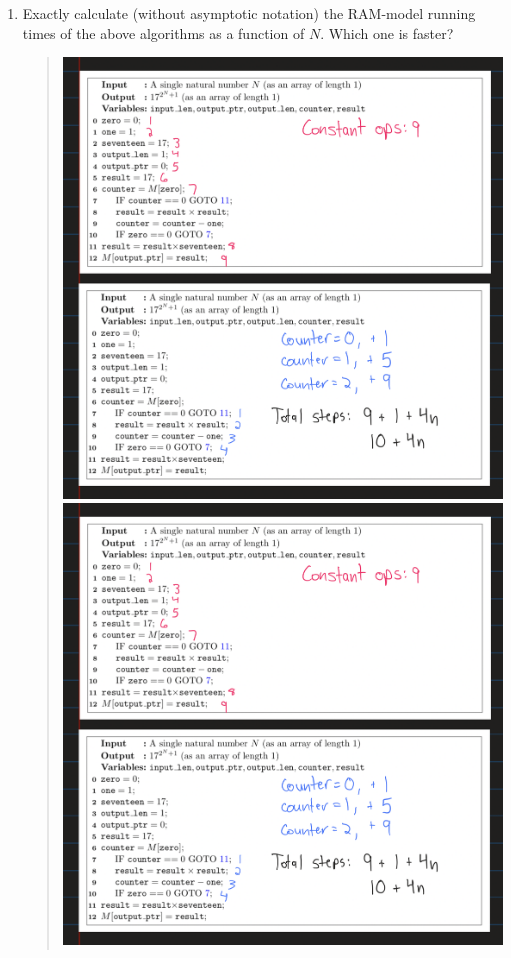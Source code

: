 \documentclass[11pt]{article}
\begin{document}
\begin{enumerate}
\begin{enumerate}
    \item Exactly calculate (without asymptotic notation) the RAM-model running times of the above algorithms as a function of $N$.
    Which one is faster? \label{itm:RAMtime}    
    \begin{quote}
        \color{purple}
        \includegraphics[scale=0.3]{work/2a 0.png}         
        \newline
        \includegraphics[scale=0.3]{work/2a 0.png}         

\end{quote}
\end{enumerate}
\end{enumerate}
\end{document}
